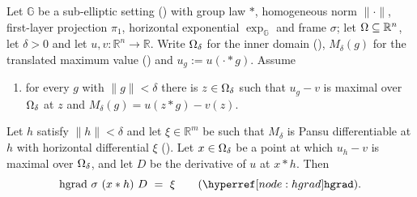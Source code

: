 \begin{lemma}[Lemma~3.6]
Let $\mathbb G$ be a sub-elliptic setting () with group law $*$,
homogeneous norm $\|\cdot\|$, first-layer projection $\pi_1$, horizontal exponential
$\exp_{\mathbb G}$ and frame $\sigma$; let $\Omega\subseteq\mathbb R^{n}$, let $\delta>0$ and
let $u,v:\mathbb R^{n}\to\mathbb R$. Write $\Omega_\delta$ for the inner domain
(), $M_\delta(g)$ for the translated maximum value
() and $u_g:=u(\cdot*g)$. Assume
\begin{enumerate}
\item for every $g$ with $\|g\|<\delta$ there is $z\in\Omega_\delta$ such that $u_g-v$ is
  maximal over $\Omega_\delta$ at $z$ and $M_\delta(g)=u(z*g)-v(z)$.
\end{enumerate}
Let $h$ satisfy $\|h\|<\delta$ and let $\xi\in\mathbb R^{m}$ be such that $M_\delta$ is
Pansu differentiable at $h$ with horizontal differential $\xi$
(). Let $x\in\Omega_\delta$ be a point at which $u_h-v$ is maximal
over $\Omega_\delta$, and let $D$ be the derivative of $u$ at $x*h$. Then
\[
 \mathrm{hgrad}\ \sigma\ (x*h)\ D\ =\ \xi \qquad(\noderef{hgrad}).
\]
\end{lemma}
